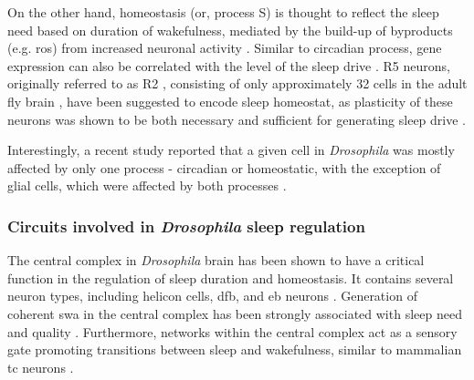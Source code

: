 \documentclass[../main.tex]{subfiles}
\begin{document}
On the other hand, homeostasis (or, process S) is thought to reflect the sleep need based on duration of wakefulness, mediated by the build-up of byproducts (e.g. \gls{ros}) from increased neuronal activity
\cite{suarez-grimaltNeuralArchitectureSleep2021,doppSinglecellTranscriptomicsReveals2024,andreaniCircadianProgrammingEllipsoid2022,schmutzSpecificRoleREVERBaControlled2014}. Similar to circadian process, gene expression can also be correlated with the level of the sleep drive \cite{liuSleepDriveEncoded2016}.
R5 neurons, originally referred to as R2 \cite{shaferRegulationDrosophilaSleep2021,liuSleepDriveEncoded2016,donleaRecurrentCircuitryBalancing2018},
consisting of only approximately 32 cells in the adult fly brain \cite{doppSinglecellTranscriptomicsReveals2024}, have been suggested to encode sleep homeostat, as plasticity of these neurons was shown to be both necessary and sufficient for generating sleep drive \cite{liuSleepDriveEncoded2016,doppSinglecellTranscriptomicsReveals2024}.

Interestingly, a recent study reported that a given cell in \textit{Drosophila} was mostly affected by only one process - circadian or homeostatic, with the exception of glial cells, which were affected by both processes \cite{doppSinglecellTranscriptomicsReveals2024}.


\subsubsection{Circuits involved in \textit{Drosophila} sleep regulation} \label{subsubsec:circuits_in_droso_sleep}

The central complex in \textit{Drosophila} brain has been shown to have a critical function in the regulation of sleep duration and homeostasis. It contains several neuron types, including helicon cells, \gls{dfb}, and \gls{eb} neurons \cite{shaferRegulationDrosophilaSleep2021}.
Generation of coherent \gls{swa} in the central complex has been strongly associated with sleep need and quality \cite{suarez-grimaltNeuralArchitectureSleep2021,raccugliaNetworkSpecificSynchronizationElectrical2019}.
Furthermore, networks within the central complex act as a sensory gate promoting transitions between sleep and wakefulness, similar to mammalian \gls{tc} neurons \cite{raccugliaCoherentMultilevelNetwork2022,gentThalamicDualControl2018}.
\end{document}
